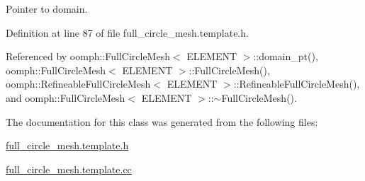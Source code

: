 Pointer to domain. 



Definition at line 87 of file full\+\_\+circle\+\_\+mesh.\+template.\+h.



Referenced by oomph\+::\+Full\+Circle\+Mesh$<$ E\+L\+E\+M\+E\+N\+T $>$\+::domain\+\_\+pt(), oomph\+::\+Full\+Circle\+Mesh$<$ E\+L\+E\+M\+E\+N\+T $>$\+::\+Full\+Circle\+Mesh(), oomph\+::\+Refineable\+Full\+Circle\+Mesh$<$ E\+L\+E\+M\+E\+N\+T $>$\+::\+Refineable\+Full\+Circle\+Mesh(), and oomph\+::\+Full\+Circle\+Mesh$<$ E\+L\+E\+M\+E\+N\+T $>$\+::$\sim$\+Full\+Circle\+Mesh().



The documentation for this class was generated from the following files\+:\begin{DoxyCompactItemize}
\item 
\hyperlink{full__circle__mesh_8template_8h}{full\+\_\+circle\+\_\+mesh.\+template.\+h}\item 
\hyperlink{full__circle__mesh_8template_8cc}{full\+\_\+circle\+\_\+mesh.\+template.\+cc}\end{DoxyCompactItemize}
